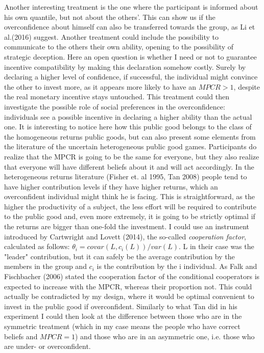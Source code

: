 \documentclass[11pt,twoside,a4paper,leqno]{article}
\begin{document}
Another interesting treatment is the one where the participant is informed about his own quantile, but not about the others'. This can show us if the overconfidence about himself can also be transferred towards the group, as Li et al.(2016)\textsuperscript{\cite{Li}} suggest. Another treatment could include the possibility to communicate to the others their own ability, opening to the possibility of strategic deception. Here an open question is whether I need or not to guarantee incentive compatibility by making this declaration somehow costly. Surely by declaring a higher level of confidence, if successful, the individual might convince the other to invest more, as it appears more likely to have an $MPCR > 1$, despite the real monetary incentive stays untouched. This treatment could then investigate the possible role of social preferences in the overconfidence: individuals see a possible incentive in declaring a higher ability than the actual one. \newline
It is interesting to notice here how this public good belongs to the class of the homogeneous returns public goods, but can also present some elements from the literature of the uncertain heterogeneous public good games. Participants do realize that the MPCR is going to be the same for everyone, but they also realize that everyone will have different beliefs about it and will act accordingly. In the heterogeneous returns literature (Fisher et. al 1995\textsuperscript{\cite{Fisher}}, Tan 2008\textsuperscript{\cite{Tan}}) people tend to have higher contribution levels if they have higher returns, which an overconfident individual might think he is facing. This is straightforward, as the higher the productivity of a subject, the less effort will be required to contribute to the public good and, even more extremely, it is going to be strictly optimal if the returns are bigger than one-fold the investment. I could use an instrument introduced by Cartwright and Lovett (2014)\textsuperscript{\cite{Cart}}, the so-called \textit{cooperation factor}, calculated as follows: $\theta _{i} = covar(L,c_{i}(L))/var(L)$. L in their case was the "leader" contribution, but it can safely be the average contribution by the members in the group and $c_{i}$ is the contribution by the i individual. As Falk and Fischbacher (2006)\textsuperscript{\cite{Falk}} stated the cooperation factor of the conditional cooperators is expected to increase with the MPCR, whereas their proportion not. This could actually be contradicted by my design, where it would be optimal convenient to invest in the public good if overconfident. Similarly to what Tan did in his experiment I could then look at the difference between those who are in the symmetric treatment (which in my case means the people who have correct beliefs and $MPCR=1$) and those who are in an asymmetric one, i.e. those who are under- or overconfident.
\end{document}
